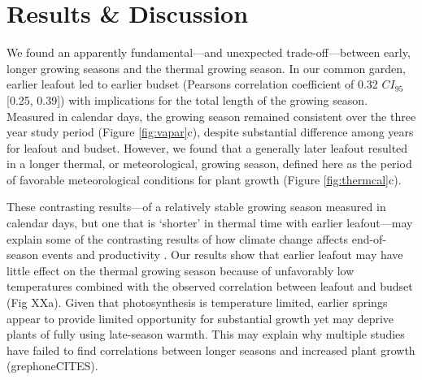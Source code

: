 \documentclass{article}[12pt]
\begin{document}
\section{Results \& Discussion} 



We found an apparently fundamental---and unexpected trade-off---between early, longer growing seasons and the thermal growing season. In our common garden, earlier leafout led to earlier budset (Pearsons correlation coefficient of 0.32 $CI_{95}$[0.25, 0.39]) with  implications for the total length of the growing season. Measured in calendar days, the growing season remained consistent over the three year study period (Figure \ref{fig:vapar}c), despite substantial difference among years for leafout and budset. However, we found that a generally later leafout resulted in a longer thermal, or meteorological, growing season, defined here as the period of favorable meteorological conditions for plant growth \citep{Korner2023} (Figure \ref{fig:thermcal}c). 

These contrasting results---of a relatively stable growing season measured in calendar days, but one that is `shorter' in thermal time with earlier leafout---may explain some of the contrasting results of how climate change affects end-of-season events and productivity \citep{Zani2020}. Our results show that earlier leafout may have little effect on the thermal growing season because of unfavorably low temperatures combined with the observed correlation between leafout and budset (Fig XXa). Given that photosynthesis is temperature limited, earlier springs appear to provide limited opportunity for substantial growth yet may deprive plants of fully using late-season warmth. This may explain why multiple studies have failed to find correlations between longer seasons and increased plant growth (grephoneCITES). 
\end{document}
